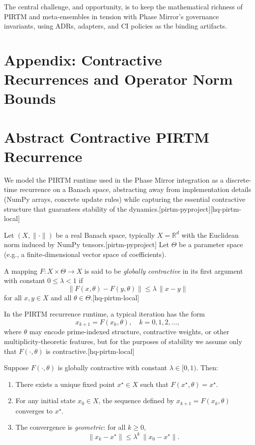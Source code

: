 \documentclass[11pt]{article}
\begin{document}
The central challenge, and opportunity, is to keep the mathematical richness of PIRTM and meta-ensembles in tension with Phase Mirror's governance invariants, using ADRs, adapters, and CI policies as the binding artifacts.

\appendix
\section*{Appendix: Contractive Recurrences and Operator Norm Bounds}

\section{Abstract Contractive PIRTM Recurrence}

We model the PIRTM runtime used in the Phase Mirror integration as a discrete-time recurrence on a Banach space, abstracting away from implementation details (NumPy arrays, concrete update rules) while capturing the essential contractive structure that guarantees stability of the dynamics.[pirtm-pyproject][hq-pirtm-local]

Let \((X,\|\cdot\|)\) be a real Banach space, typically \(X = \mathbb{R}^d\) with the Euclidean norm induced by NumPy tensors.[pirtm-pyproject] Let \(\Theta\) be a parameter space (e.g., a finite-dimensional vector space of coefficients).

\begin{definition}
A mapping \(F : X \times \Theta \to X\) is said to be \emph{globally contractive} in its first argument with constant \(0 \leq \lambda < 1\) if
\[
  \|F(x,\theta) - F(y,\theta)\| \leq \lambda \, \|x - y\|
\]
for all \(x,y \in X\) and all \(\theta \in \Theta\).[hq-pirtm-local]
\end{definition}

In the PIRTM recurrence runtime, a typical iteration has the form
\[
  x_{k+1} = F(x_k,\theta), \quad k = 0,1,2,\dots,
\]
where \(\theta\) may encode prime-indexed structure, contractive weights, or other multiplicity-theoretic features, but for the purposes of stability we assume only that \(F(\cdot,\theta)\) is contractive.[hq-pirtm-local]

\begin{theorem}
\label{thm:banach}
Suppose \(F(\cdot,\theta)\) is globally contractive with constant \(\lambda \in [0,1)\). Then:
\begin{enumerate}
  \item There exists a unique fixed point \(x^\star \in X\) such that \(F(x^\star,\theta) = x^\star\).
  \item For any initial state \(x_0 \in X\), the sequence defined by \(x_{k+1} = F(x_k,\theta)\) converges to \(x^\star\).
  \item The convergence is \emph{geometric}: for all \(k \geq 0\),
  \[
    \|x_k - x^\star\| \leq \lambda^k \, \|x_0 - x^\star\|.
  \]
\end{enumerate}
\end{theorem}
\end{document}

